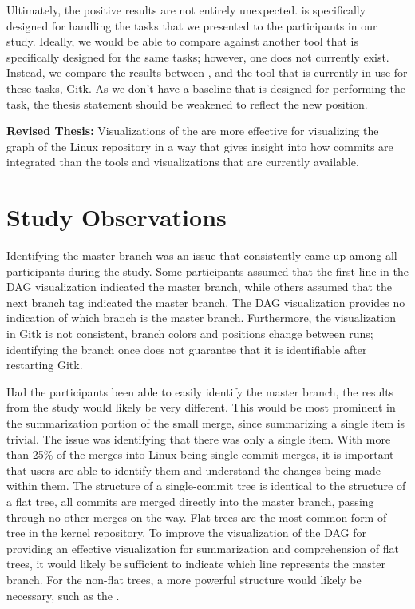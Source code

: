 Ultimately, the positive results are not entirely unexpected.
\tool{} is specifically designed for handling the tasks that we
presented to the participants in our study.
Ideally, we would be able to compare against another tool that is
specifically designed for the same tasks; however, one does not
currently exist.
Instead, we compare the results between \tool{}, and the tool that is
currently in use for these tasks, Gitk.
As we don't have a baseline that is designed for performing the task,
the thesis statement should be weakened to reflect the new position.

\begin{textbox}
  \textbf{Revised Thesis:} Visualizations of the \mt{} are more
  effective for visualizing the graph of the Linux repository in a way
  that gives insight into how commits are integrated than the tools and
  visualizations that are currently available.
\end{textbox}

\section{Study Observations}\label{sec:study_observations}

Identifying the master branch was an issue that consistently came up
among all participants during the study. Some participants assumed that
the first line in the DAG visualization indicated the master branch,
while others assumed that the next branch tag indicated the master
branch. The DAG visualization provides no indication of which branch is
the master branch. Furthermore, the visualization in Gitk is not
consistent, branch colors and positions change between runs; identifying
the branch once does not guarantee that it is identifiable after
restarting Gitk.

Had the participants been able to easily identify the master branch, the
results from the study would likely be very different. This would be
most prominent in the summarization portion of the small merge, since
summarizing a single item is trivial.
The issue was identifying that there was only a single item.
With more than 25\% of the merges into Linux being single-commit merges,
it is important that users are able to identify them and understand the
changes being made within them. The structure of a single-commit tree is
identical to the structure of a flat tree, all commits are merged
directly into the master branch, passing through no other merges on the
way. Flat trees are the most common form of tree in the kernel
repository. To improve the visualization of the DAG for providing an
effective visualization for summarization and comprehension of flat
trees, it would likely be sufficient to indicate which line represents
the master branch.
For the non-flat trees, a more powerful structure would likely be
necessary, such as the \mt{}.

